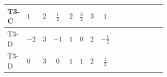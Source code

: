 \documentclass[8pt]{article}
\begin{document}
\begin{landscape}
\begin{longtable}{@{}llcccccc >{\raggedright\arraybackslash}p{0.21\linewidth} >{\raggedright\arraybackslash}p{0.21\linewidth} >{\raggedright\arraybackslash}p{0.21\linewidth}@{}}
T3-C & $1$ & $2$ & $\frac{1}{2}$ & $2$ & $\frac{3}{2}$ & $3$ & $1$ & \scriptsize\adjustbox{max width=\linewidth}{$\begin{gathered} +\frac{3}{2} (\left({Y_d}\,\left({Y_d}\right)^{\dagger}\,{Y_d}\right)_{ij}-\left({Y_u}\,\left({Y_u}\right)^{\dagger}\,{Y_d}\right)_{ij})\end{gathered}$} & \scriptsize\adjustbox{max width=\linewidth}{$\begin{gathered} -\frac{9}{4} {g_2}^2 \left({Y_d}\right)_{ij}\end{gathered}$} & \scriptsize\adjustbox{max width=\linewidth}{$\begin{gathered} -8 {g_3}^2 \left({Y_d}\right)_{ij}\end{gathered}$} \\
\midrule
T3-D & $-2$ & $3$ & $-1$ & $1$ & $0$ & $2$ & $-\frac{1}{2}$ & \scriptsize\adjustbox{max width=\linewidth}{$\begin{gathered} +\frac{3}{2} (\left({Y_d}\,\left({Y_d}\right)^{\dagger}\,{Y_d}\right)_{ij}-\left({Y_u}\,\left({Y_u}\right)^{\dagger}\,{Y_d}\right)_{ij})\end{gathered}$} & \scriptsize\adjustbox{max width=\linewidth}{$\begin{gathered} -\frac{9}{4} {g_2}^2 \left({Y_d}\right)_{ij}\end{gathered}$} & \scriptsize\adjustbox{max width=\linewidth}{$\begin{gathered} -8 {g_3}^2 \left({Y_d}\right)_{ij}\end{gathered}$} \\
\midrule
T3-D & $0$ & $3$ & $0$ & $1$ & $1$ & $2$ & $\frac{1}{2}$ & \scriptsize\adjustbox{max width=\linewidth}{$\begin{gathered} +\frac{3}{2} (\left({Y_d}\,\left({Y_d}\right)^{\dagger}\,{Y_d}\right)_{ij}-\left({Y_u}\,\left({Y_u}\right)^{\dagger}\,{Y_d}\right)_{ij})\end{gathered}$} & \scriptsize\adjustbox{max width=\linewidth}{$\begin{gathered} -\frac{9}{4} {g_2}^2 \left({Y_d}\right)_{ij}\end{gathered}$} & \scriptsize\adjustbox{max width=\linewidth}{$\begin{gathered} -8 {g_3}^2 \left({Y_d}\right)_{ij}\end{gathered}$} \\
\midrule

\end{longtable}
\end{landscape}
\end{document}
